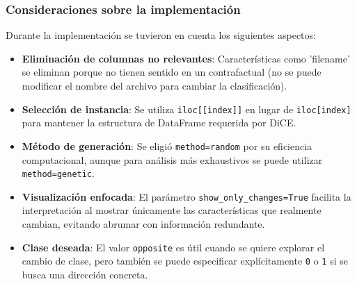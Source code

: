\subsubsection*{Consideraciones sobre la implementación}

Durante la implementación se tuvieron en cuenta los siguientes aspectos:

\begin{itemize}
    \item \textbf{Eliminación de columnas no relevantes}: Características como 'filename' se eliminan porque no tienen sentido en un contrafactual (no se puede modificar el nombre del archivo para cambiar la clasificación).
    
    \item \textbf{Selección de instancia}: Se utiliza \texttt{iloc[[index]]} en lugar de \texttt{iloc[index]} para mantener la estructura de DataFrame requerida por DiCE.
    
    \item \textbf{Método de generación}: Se eligió \texttt{method=random} por su eficiencia computacional, aunque para análisis más exhaustivos se puede utilizar \texttt{method=genetic}.
    
    \item \textbf{Visualización enfocada}: El parámetro \texttt{show\_only\_changes=True} facilita la interpretación al mostrar únicamente las características que realmente cambian, evitando abrumar con información redundante.
    
    \item \textbf{Clase deseada}: El valor \texttt{opposite} es útil cuando se quiere explorar el cambio de clase, pero también se puede especificar explícitamente \texttt{0} o \texttt{1} si se busca una dirección concreta.
\end{itemize}